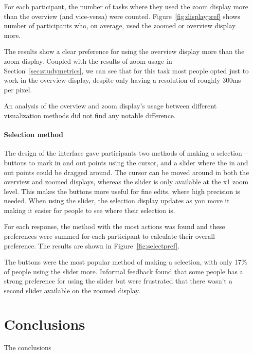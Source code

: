 For each participant, the number of tasks where they used the zoom display more than the overview (and vice-versa) were
counted. Figure~\ref{fig:displaypref} shows number of participants who, on average, used the zoomed or overview display
more.

The results show a clear preference for using the overview display more than the zoom display. Coupled with the results
of zoom usage in Section~\ref{sec:studymetrics}, we can see that for this task most people opted just to work in the
overview display, despite only having a resolution of roughly 300ms per pixel.

An analysis of the overview and zoom display's usage between different visualization methods did not find any notable
difference.

\paragraph{Selection method}
The design of the interface gave participants two methods of making a selection -- buttons to mark in and out points
using the cursor, and a slider where the in and out points could be dragged around. The cursor can be moved around in
both the overview and zoomed displays, whereas the slider is only available at the x1 zoom level. This makes the
buttons more useful for fine edits, where high precision is needed. When using the slider, the selection display
updates as you move it making it easier for people to see where their selection is.

For each response, the method with the most actions was found and these preferences were summed for each participant to
calculate their overall preference. The results are shown in Figure~\ref{fig:selectpref}.

The buttons were the most popular method of making a selection, with only 17\% of people using the slider more.
Informal feedback found that some people has a strong preference for using the slider but were frustrated that there
wasn't a second slider available on the zoomed display.

\section{Conclusions}\label{sec:colourised-conclusions}

The conclusions
